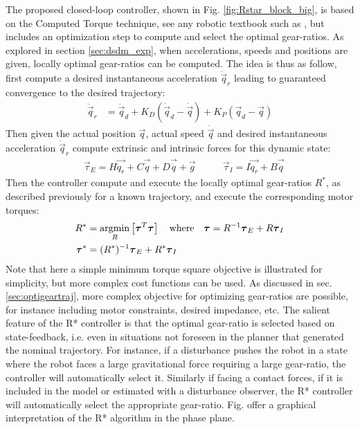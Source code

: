 The proposed closed-loop controller, shown in Fig. \ref{fig:Rstar_block_big}, is based on the Computed Torque technique, see any robotic textbook such as \cite{asada_robot_1986}, but includes an optimization step to compute and select the optimal gear-ratios. As explored in section \ref{sec:dsdm_exp}, when accelerations, speeds and positions are given, locally optimal gear-ratios can be computed. The idea is thus as follow, first compute a desired instantaneous acceleration $\ddot{\vec{q}}_r$ leading to guaranteed convergence to the desired trajectory:
%
\begin{align}
\ddot{\vec{q}}_r &= \ddot{\vec{q}}_d + K_D ( \dot{\vec{q}}_d - \dot{\vec{q}} ) + K_P ( \vec{q}_d - \vec{q} ) 
\end{align} 
%
Then given the actual position $\vec{q}$, actual speed $\dot{\vec{q}}$ and desired instantaneous acceleration $\ddot{\vec{q}}_r$ compute extrinsic and intrinsic forces for this dynamic state:
%
\begin{align}
	&\vec{\tau}_{E} = H \vec{ \ddot{q}_r } + C\vec{ \dot{q} } + D \vec{ \dot{q} } + \vec{ g } \quad\quad
	&\vec{\tau}_{I} = I \vec{ \ddot{q}_r } + B \vec{ \dot{q} } 
\end{align}
%
Then the controller compute and execute the locally optimal gear-ratios $R^*$, as described previously for a known trajectory, and execute the corresponding motor torques: 
%
\begin{align}
R^{*} &= \operatornamewithlimits{argmin}\limits_{R} \left[ \vec{\tau}^T\vec{\tau}  \right] \quad\text{where}\quad \vec{\tau} = R^{-1} \vec{\tau}_{E} + R \vec{\tau}_{I}
\\
\vec{\tau}^* &= (R^*)^{-1} \vec{\tau}_{E} + R^* \vec{\tau}_{I}
\end{align} 
%
Note that here a simple minimum torque square objective is illustrated for simplicity, but more complex cost functions can be used. As discussed in sec. \ref{sec:optigeartraj}, more complex objective for optimizing gear-ratios are possible, for instance including motor constraints, desired impedance, etc. 
%
The salient feature of the R* controller is that the optimal gear-ratio is selected based on state-feedback, i.e. even in situations not foreseen in the planner that generated the nominal trajectory. For instance, if a disturbance pushes the robot in a state where the robot faces a large gravitational force requiring a large gear-ratio, the controller will automatically select it. Similarly if facing a contact forces, if it is included in the model or estimated with a disturbance observer, the R* controller will automatically select the appropriate gear-ratio. Fig. \pageref{fig:dq} offer a graphical interpretation of the R* algorithm in the phase plane. 

